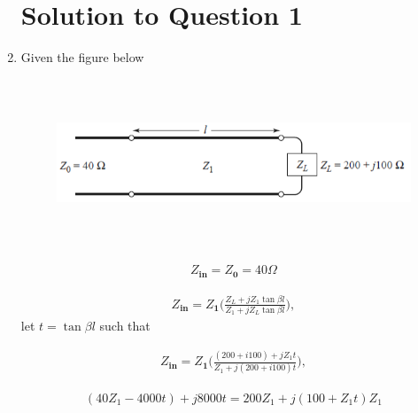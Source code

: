 \documentclass[12pt,a4paper,openright]{report}
\begin{document}
	\begin{enumerate}
		\noindent \section*{Solution to Question 1}
		\item Given the figure below
		\begin{figure}[H]
			\centering
			\includegraphics[width=11.3cm,height=5cm]{figure1.png}
			\label{F1}
		\end{figure}
		\begin{align*}
		Z_{\mathbf{in}}=Z_{\mathbf{0}}=40\Omega
		\end{align*}
		
		\begin{align*}
		Z_{\mathbf{in}}=Z_{\mathbf{1}}\biggl(\frac{Z_L+jZ_1{\tan}{\beta}l}{Z_1+jZ_L{\tan}{\beta}l}\biggr),
		\end{align*}
		let $t={\tan}{\beta}l$ such that
		
		\begin{align*}
		Z_{\mathbf{in}}=Z_{\mathbf{1}}\biggl(\frac{(200+i100)+jZ_1t}{Z_1+j(200+i100)t}\biggr),
		\end{align*}
		
		\begin{align*}
		(40Z_{1}-4000t)+j8000t=200Z_{1}+j(100+Z_{1}t)Z_{1}
		\end{align*}
		

\end{enumerate}
\end{document}
